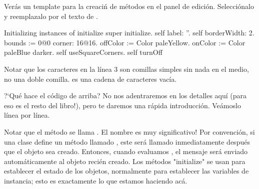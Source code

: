 \documentclass[a4paper,10pt,twoside]{book}
\begin{document}
Verás un template para la creaciń de métodos en el panel de edición.
Selecciónalo y reemplazalo por el texto de .


\begin{numMethod}[scbecellinitialize]{Initializing instances of }
initialize
   super initialize.
   self label: ''.
   self borderWidth: 2.
   bounds := 0@0 corner: 16@16.
   offColor := Color paleYellow.
   onColor := Color paleBlue darker.
   self useSquareCorners.
   self turnOff
\end{numMethod}


\noindent
Notar que los caracteres  en la línea 3 son comillas simples sin nada en el medio, no una doble comilla.  es una cadena de caracteres vacía. 




?`Qué hace el código de arriba? No nos adentraremos en los detalles aquí (para eso es el resto del libro!), pero te daremos una rápida introducción. Veámoslo línea por línea.


Notar que el método se llama .
El nombre es muy significativo!
Por convención, si una clase define un método llamado , este será llamado inmediatamente después que el objeto sea creado. 
Entonces, cuando evaluamos , el mensaje  será enviado automáticamente al objeto recién creado. 
Los métodos "initialize" se usan para establecer el estado de los objetos, normalmente para establecer las variables de instancia; esto es exactamente lo que estamos haciendo acá. 
\end{document}
